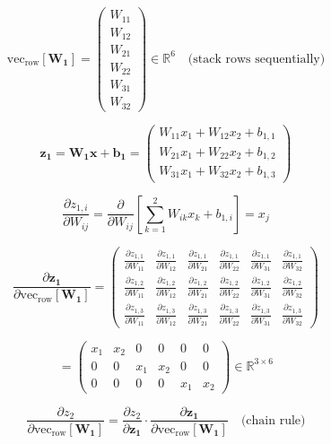 \documentclass[
  letterpaper,
  DIV=11,
  numbers=noendperiod]{scrartcl}
\begin{document}
\[\text{vec}_{\text{row}}[\mathbf{W_1}] = \begin{pmatrix}W_{11}\\W_{12}\\W_{21}\\W_{22}\\W_{31}\\W_{32}\end{pmatrix} \in \mathbb{R}^6 \quad \text{(stack rows sequentially)}\]

\[\mathbf{z_1} = \mathbf{W_1}\mathbf{x} + \mathbf{b_1} = \begin{pmatrix}W_{11}x_1 + W_{12}x_2 + b_{1,1}\\W_{21}x_1 + W_{22}x_2 + b_{1,2}\\W_{31}x_1 + W_{32}x_2 + b_{1,3}\end{pmatrix}\]

\[\frac{\partial z_{1,i}}{\partial W_{ij}} = \frac{\partial}{\partial W_{ij}}\left[\sum_{k=1}^2 W_{ik}x_k + b_{1,i}\right] = x_j\]

\[\frac{\partial \mathbf{z_1}}{\partial \text{vec}_{\text{row}}[\mathbf{W_1}]} = \begin{pmatrix}
\frac{\partial z_{1,1}}{\partial W_{11}} & \frac{\partial z_{1,1}}{\partial W_{12}} & \frac{\partial z_{1,1}}{\partial W_{21}} & \frac{\partial z_{1,1}}{\partial W_{22}} & \frac{\partial z_{1,1}}{\partial W_{31}} & \frac{\partial z_{1,1}}{\partial W_{32}}\\
\frac{\partial z_{1,2}}{\partial W_{11}} & \frac{\partial z_{1,2}}{\partial W_{12}} & \frac{\partial z_{1,2}}{\partial W_{21}} & \frac{\partial z_{1,2}}{\partial W_{22}} & \frac{\partial z_{1,2}}{\partial W_{31}} & \frac{\partial z_{1,2}}{\partial W_{32}}\\
\frac{\partial z_{1,3}}{\partial W_{11}} & \frac{\partial z_{1,3}}{\partial W_{12}} & \frac{\partial z_{1,3}}{\partial W_{21}} & \frac{\partial z_{1,3}}{\partial W_{22}} & \frac{\partial z_{1,3}}{\partial W_{31}} & \frac{\partial z_{1,3}}{\partial W_{32}}
\end{pmatrix}\]

\[= \begin{pmatrix}
x_1 & x_2 & 0 & 0 & 0 & 0\\
0 & 0 & x_1 & x_2 & 0 & 0\\
0 & 0 & 0 & 0 & x_1 & x_2
\end{pmatrix} \in \mathbb{R}^{3 \times 6}\]

\[\frac{\partial z_2}{\partial \text{vec}_{\text{row}}[\mathbf{W_1}]} = \frac{\partial z_2}{\partial \mathbf{z_1}} \cdot \frac{\partial \mathbf{z_1}}{\partial \text{vec}_{\text{row}}[\mathbf{W_1}]} \quad \text{(chain rule)}\]
\end{document}

